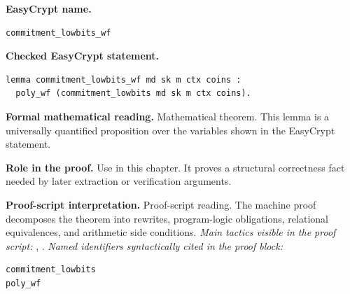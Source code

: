 \begin{formaltheorem}
\noindent\textbf{EasyCrypt name.}
\begin{lstlisting}[language=EasyCrypt,basicstyle=\ttfamily\scriptsize]
commitment_lowbits_wf
\end{lstlisting}
\noindent\textbf{Checked EasyCrypt statement.}
\begin{lstlisting}[language=EasyCrypt,basicstyle=\ttfamily\scriptsize]
lemma commitment_lowbits_wf md sk m ctx coins :
  poly_wf (commitment_lowbits md sk m ctx coins).
\end{lstlisting}
\noindent\textbf{Formal mathematical reading.}
Mathematical theorem. This lemma is a universally quantified proposition over the variables shown in the EasyCrypt statement.

\noindent\textbf{Role in the proof.}
Use in this chapter. It proves a structural correctness fact needed by later extraction or verification arguments.

\noindent\textbf{Proof-script interpretation.}
Proof-script reading. The machine proof decomposes the theorem into rewrites, program-logic obligations, relational equivalences, and arithmetic side conditions.
\emph{Main tactics visible in the proof script:} , .
\emph{Named identifiers syntactically cited in the proof block:}
\begin{lstlisting}[language=EasyCrypt,basicstyle=\ttfamily\scriptsize]
commitment_lowbits
poly_wf
\end{lstlisting}

\end{formaltheorem}

